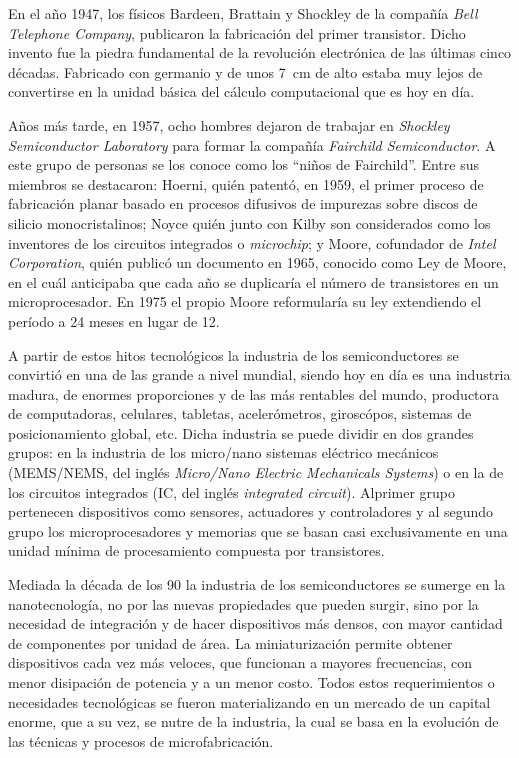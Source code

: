 		En el año 1947, los físicos Bardeen, Brattain y Shockley de la compañía \textit{Bell Telephone Company}, publicaron la fabricación del primer transistor. Dicho invento fue la piedra fundamental de la revolución electrónica de las últimas cinco décadas. Fabricado con germanio y de unos \SI{7}{cm} de alto estaba muy lejos de convertirse en la unidad básica del cálculo computacional que es hoy en día. \cite{riordan1999} 

		Años más tarde, en 1957, ocho hombres dejaron de trabajar en \textit{Shockley Semiconductor Laboratory} para formar la compañía \textit{Fairchild Semiconductor}. A este grupo de personas se los conoce como los ``niños de Fairchild''. Entre sus miembros se destacaron: Hoerni, quién patentó, en 1959, el primer proceso de fabricación planar basado en   procesos difusivos de impurezas sobre discos de silicio monocristalinos; Noyce quién junto con Kilby son considerados como los inventores de los circuitos integrados o \textit{microchip}; y Moore, cofundador de \textit{Intel Corporation}, quién publicó un documento en 1965, conocido como Ley de Moore, en el cuál anticipaba que cada año se duplicaría el número de transistores en un microprocesador. En 1975 el propio Moore reformularía su ley extendiendo el período a 24 meses en lugar de 12. \cite{moore2006,riordan1999,fagen1984}

		A partir de estos hitos tecnológicos la industria de los semiconductores se convirtió en una de las grande a nivel mundial, siendo hoy en día es una industria madura, de enormes proporciones y de las más rentables del mundo, productora de computadoras, celulares, tabletas, acelerómetros, giroscópos, sistemas de posicionamiento global, etc. Dicha industria se puede dividir en dos grandes grupos: en la industria de los micro/nano sistemas eléctrico mecánicos (MEMS/NEMS, del inglés \textit{Micro/Nano Electric Mechanicals Systems}) o en la de los circuitos integrados (IC, del inglés \textit{integrated circuit}). Al\space primer grupo pertenecen dispositivos como sensores, actuadores y controladores y al segundo grupo los microprocesadores y memorias que se basan casi exclusivamente en una unidad mínima de procesamiento compuesta por transistores.\cite{Franssila2004,Jaeger2001,Madou2002}

 		Mediada la década de los 90 la industria de los semiconductores se sumerge en la nanotecnología, no por las nuevas propiedades que pueden surgir, sino por la necesidad de integración y de hacer dispositivos más densos, con mayor cantidad de componentes por unidad de área. La miniaturización permite obtener dispositivos cada vez más  veloces, que funcionan a mayores frecuencias, con menor disipación de potencia y a un menor costo. Todos estos requerimientos o necesidades tecnológicas se fueron materializando en un mercado de un capital enorme, que a su vez, se nutre de la industria, la cual se basa en la evolución de las técnicas y procesos de microfabricación.

